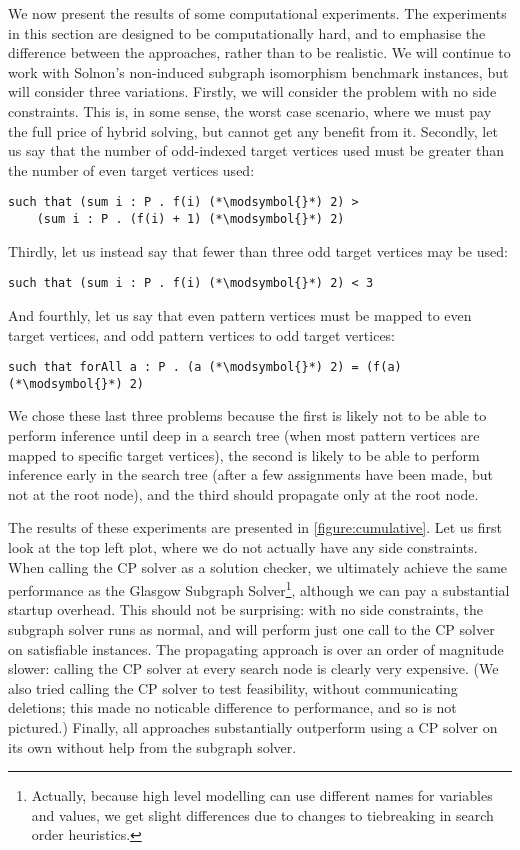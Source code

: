 \documentclass[runningheads]{llncs}
\begin{document}
We now present the results of some computational experiments. The experiments in this section are
designed to be computationally hard, and to emphasise the difference between the approaches, rather
than to be realistic. We will continue to work with Solnon's non-induced subgraph isomorphism
benchmark instances, but will consider three variations. Firstly, we will consider the problem with
no side constraints. This is, in some sense, the worst case scenario, where we must pay the full
price of hybrid solving, but cannot get any benefit from it. Secondly, let us say that the number of
odd-indexed target vertices used must be greater than the number of even target vertices used:
\newcommand{\modsymbol}{\%}
\begin{lstlisting}
such that (sum i : P . f(i) (*\modsymbol{}*) 2) >
    (sum i : P . (f(i) + 1) (*\modsymbol{}*) 2)
\end{lstlisting}
Thirdly, let us instead say that fewer than three odd target vertices may be used:
\begin{lstlisting}
such that (sum i : P . f(i) (*\modsymbol{}*) 2) < 3
\end{lstlisting}
And fourthly, let us say that even pattern vertices must be mapped to even target vertices, and odd
pattern vertices to odd target vertices:
\begin{lstlisting}
such that forAll a : P . (a (*\modsymbol{}*) 2) = (f(a) (*\modsymbol{}*) 2)
\end{lstlisting}

We chose these last three problems because the first is likely not to be able to
perform inference until deep in a search tree (when most pattern vertices are mapped to specific
target vertices), the second is likely to be able to perform inference early in the search tree
(after a few assignments have been made, but not at the root node), and the third should propagate
only at the root node.

The results of these experiments are presented in \cref{figure:cumulative}. Let us first look at the
top left plot, where we do not actually have any side constraints. When calling the CP solver as a
solution checker, we ultimately achieve the same performance as the Glasgow Subgraph
Solver\footnote{Actually, because high level modelling can use different names for variables and
values, we get slight differences due to changes to tiebreaking in search order heuristics.},
although we can pay a substantial startup overhead. This should not be surprising: with no side
constraints, the subgraph solver runs as normal, and will perform just one call to the CP solver on
satisfiable instances. The propagating approach is over an order of magnitude slower: calling the CP
solver at every search node is clearly very expensive. (We also tried calling the CP solver to test
feasibility, without communicating deletions; this made no noticable difference to performance, and
so is not pictured.) Finally, all approaches substantially outperform using a CP solver on its own
without help from the subgraph solver.
\end{document}
